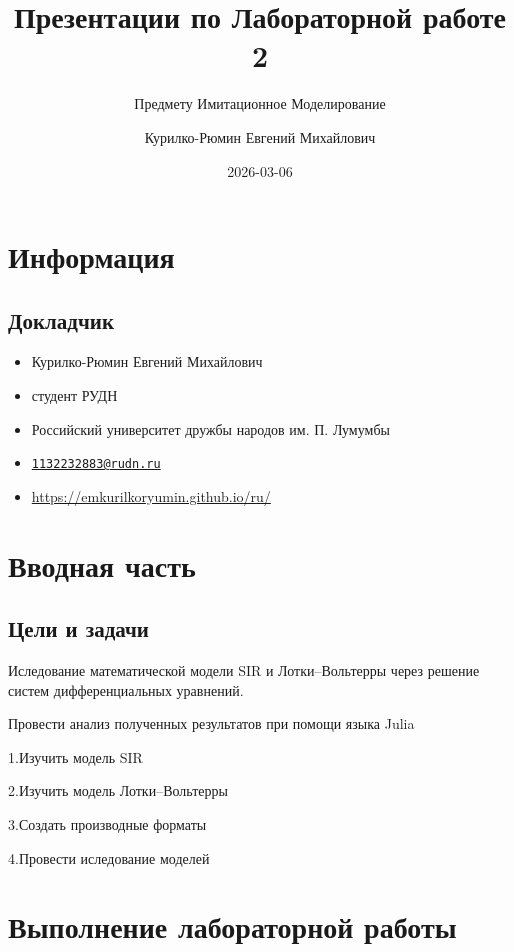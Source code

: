 \documentclass[
  letterpaper,
  DIV=11,
  numbers=noendperiod]{scrartcl}
\title{Презентации по Лабораторной работе 2}
\subtitle{Предмету Имитационное Моделирование}
\author{Курилко-Рюмин Евгений Михайлович}
\date{2026-03-06}
\providecommand{\tightlist}{%
  \setlength{\itemsep}{0pt}\setlength{\parskip}{0pt}}\usepackage{longtable,booktabs,array}
\begin{document}
\maketitle


\section{Информация}\label{ux438ux43dux444ux43eux440ux43cux430ux446ux438ux44f}

\subsection{Докладчик}\label{ux434ux43eux43aux43bux430ux434ux447ux438ux43a}

\begin{itemize}
\tightlist
\item
  Курилко-Рюмин Евгений Михайлович
\item
  студент РУДН
\item
  Российский университет дружбы народов им. П. Лумумбы
\item
  \href{mailto:1132232883@rudn.ru}{\nolinkurl{1132232883@rudn.ru}}
\item
  \url{https://emkurilkoryumin.github.io/ru/}
\end{itemize}

\section{Вводная
часть}\label{ux432ux432ux43eux434ux43dux430ux44f-ux447ux430ux441ux442ux44c}

\subsection{Цели и
задачи}\label{ux446ux435ux43bux438-ux438-ux437ux430ux434ux430ux447ux438}

Иследование математической модели SIR и Лотки--Вольтерры через решение
систем дифференциальных уравнений.

Провести анализ полученных результатов при помощи языка Julia

1.Изучить модель SIR

2.Изучить модель Лотки--Вольтерры

3.Создать производные форматы

4.Провести иследование моделей

\section{Выполнение лабораторной
работы}\label{ux432ux44bux43fux43eux43bux43dux435ux43dux438ux435-ux43bux430ux431ux43eux440ux430ux442ux43eux440ux43dux43eux439-ux440ux430ux431ux43eux442ux44b}
\end{document}
